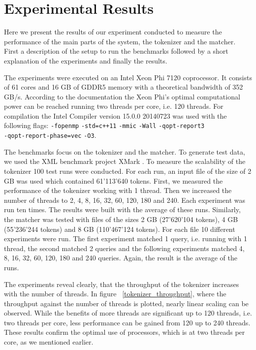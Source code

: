 
\section{Experimental Results}\label{sec:exp}

Here we present the results of our experiment conducted to measure the performance of the main parts of the system, the tokenizer and the matcher. First a description of the setup to run the benchmarks followed by a short explanation of the experiments and finally the results.

 The experiments were executed on an Intel Xeon Phi 7120 coprocessor. It consists of 61 cores and 16 GB of GDDR5 memory with a theoretical bandwidth of 352 GB/s. According to the documentation the Xeon Phi's optimal computational power can be reached running two threads per core, i.e. 120 threads.
For compilation the Intel Compiler version 15.0.0 20140723 was used with the following flags: \verb;-fopenmp; \verb;-std=c++11; \verb;-mmic; \verb;-Wall; \verb;-qopt-report3; \\ \verb;-qopt-report-phase=vec; \verb;-O3;.

The benchmarks focus on the tokenizer and the matcher. To generate test data, we used the XML benchmark project XMark \cite{Schmidt2002}. To measure the scalability of the tokenizer 100 test runs were conducted. For each run, an input file of the size of 2 GB was used which contained 61'113'640 tokens. First, we measured the performance of the tokenizer working with 1 thread. Then we increased the number of threads to 2, 4, 8, 16, 32, 60, 120, 180 and 240. Each experiment was run ten times. The results were built with the average of these runs. Similarly, the matcher was tested with files of the sizes 2 GB (27'620'104 tokens), 4 GB (55'236'244 tokens) and 8 GB (110'467'124 tokens). For each file 10 different experiments were run. The first experiment matched 1 query, i.e. running with 1 thread, the second matched 2 queries and the following experiments matched 4, 8, 16, 32, 60, 120, 180 and 240 queries. Again, the result is the average of the runs.

The experiments reveal clearly, that the throughput of the tokenizer increases with the number of threads. In figure ~\ref{tokenizer_throughput}, where the throughput against the number of threads is plotted, nearly linear scaling can be observed. While the benefits of more threads are significant up to 120 threads, i.e. two threads per core, less performance can be gained from 120 up to 240 threads. These results confirm the optimal use of processors, which is at two threads per core, as we mentioned earlier.

